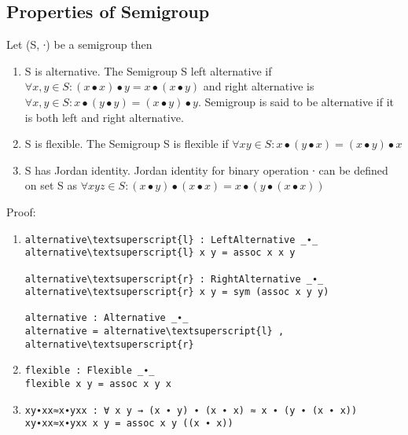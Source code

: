 \subsection{Properties of Semigroup}
Let (S, ∙) be a semigroup then
\begin{enumerate}
\item S is alternative. The Semigroup S left alternative if \( \forall x,y \in S : (x ∙ x) ∙ y = x ∙ (x ∙ y) \) and right alternative is \(\forall x,y \in S : x ∙ (y ∙ y) = (x ∙ y) ∙ y\). Semigroup is said to be alternative if it is both left and right alternative. 
\item S is flexible. The Semigroup S is flexible if \(\forall x y \in S: x ∙ (y ∙ x) = (x ∙ y) ∙ x\)
\item S has Jordan identity.  Jordan identity for binary operation ∙ can be defined on set S as \( \forall x y z \in S: (x ∙ y) ∙ (x ∙ x) = x ∙ (y ∙ (x ∙ x)) \)
\end{enumerate}
Proof:
\begin{enumerate}
\item
\begin{Verbatim}[commandchars=\\\{\},samepage=true]
alternative\textsuperscript{l} : LeftAlternative _∙_
alternative\textsuperscript{l} x y = assoc x x y

alternative\textsuperscript{r} : RightAlternative _∙_
alternative\textsuperscript{r} x y = sym (assoc x y y)

alternative : Alternative _∙_
alternative = alternative\textsuperscript{l} , alternative\textsuperscript{r}
\end{Verbatim}
 \item
\begin{Verbatim}[commandchars=\\\{\},samepage=true]
flexible : Flexible _∙_
flexible x y = assoc x y x
\end{Verbatim}
\item
\begin{Verbatim}[commandchars=\\\{\},samepage=true]
xy∙xx≈x∙yxx : ∀ x y → (x ∙ y) ∙ (x ∙ x) ≈ x ∙ (y ∙ (x ∙ x))
xy∙xx≈x∙yxx x y = assoc x y ((x ∙ x))
\end{Verbatim}
\end{enumerate}
